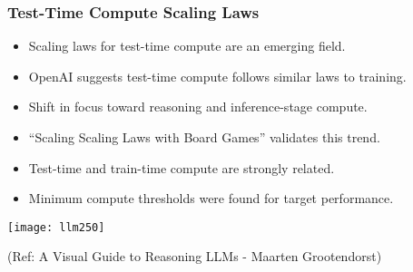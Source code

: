 \begin{frame}[fragile]\frametitle{Test-Time Compute Scaling Laws}

      \begin{itemize}
        \item Scaling laws for test-time compute are an emerging field.
        \item OpenAI suggests test-time compute follows similar laws to training.
        \item Shift in focus toward reasoning and inference-stage compute.
        \item “Scaling Scaling Laws with Board Games” validates this trend.
        \item Test-time and train-time compute are strongly related.
        \item Minimum compute thresholds were found for target performance.
      \end{itemize}

        \begin{center}
        \texttt{[image: llm250]}
		
		{\tiny (Ref: A Visual Guide to Reasoning LLMs - Maarten Grootendorst)}
		
        \end{center}    

\end{frame}

